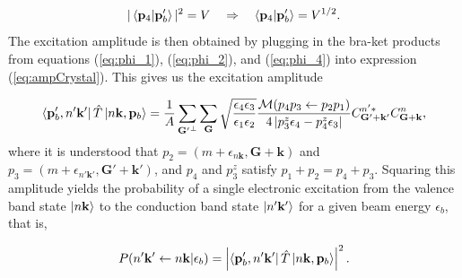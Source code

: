 \documentclass{article}
\begin{document}
\begin{equation} 
  \label{eq:phi_4}
    |\bra{\mathbf{p}_4}\ket{\mathbf{p}_b'}|^2
    =
    V \quad\Rightarrow\quad \bra{\mathbf{p}_4}\ket{\mathbf{p}_b'}
    =
    V^{1/2}.
\end{equation}
%
The excitation amplitude is then obtained by plugging in the bra-ket products from
equations (\ref{eq:phi_1}), (\ref{eq:phi_2}), and (\ref{eq:phi_4}) into
expression (\ref{eq:ampCrystal}). This gives us the excitation amplitude

\begin{equation} 
  \begin{aligned}
      \bra{\mathbf{p}_b', n'\mathbf{k'}} \hat{T} \ket{n\mathbf{k},\mathbf{p}_b}
      =
      \frac{1}{A}
      \sum_{\mathbf{G'}^\perp} \sum_{\mathbf{G}}
      \sqrt{\frac{ \epsilon_4\epsilon_3 }{ \epsilon_1\epsilon_2 }}
      \frac{\mathcal{M}(p_4p_3\leftarrow p_2p_1)}
      {4\left|p_3^z\epsilon_4 - p_4^z\epsilon_3\right|}
      C_{\mathbf{G'+k'}}^{n'\ast} C_{\mathbf{G+k}}^{n},
  \end{aligned}
  \label{eq:ampCode} 
\end{equation}
%
where it is understood that $p_2 = (m + \epsilon_{n\mathbf{k}}, \mathbf{G+k})$ and
$p_3 = (m + \epsilon_{n'\mathbf{k'}}, \mathbf{G'+k'})$,
%
and $p_4$ and $p_3^z$ satisfy $p_1 + p_2 = p_4 + p_3$.
Squaring this amplitude yields the probability of a single electronic
excitation from the valence band state $\ket{n\mathbf{k}}$ to the conduction
band state $\ket{n'\mathbf{k'}}$ for a given beam energy $\epsilon_b$, that is,

\begin{equation}
  P(n'\mathbf{k'}\leftarrow n\mathbf{k}|\epsilon_b)
  =
  \left|
  \bra{\mathbf{p}_b', n'\mathbf{k'}} \hat{T} \ket{n\mathbf{k},\mathbf{p}_b}
  \right|^2.
  \label{eq:prob}
\end{equation}
%
\end{document}
